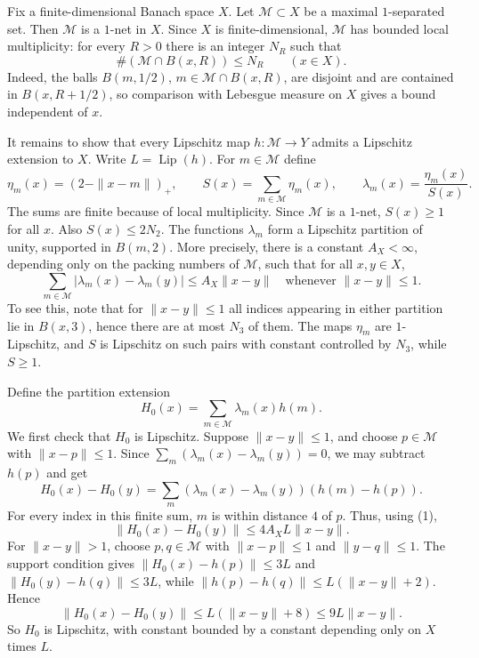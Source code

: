 \documentclass[11pt]{article}
\newcommand{\M}{\mathcal{M}}
\newcommand{\Lip}{\operatorname{Lip}}
\begin{document}
Fix a finite-dimensional Banach space \(X\).  Let \(\M\subset X\) be a
maximal \(1\)-separated set.  Then \(\M\) is a \(1\)-net in \(X\).  Since
\(X\) is finite-dimensional, \(\M\) has bounded local multiplicity: for every
\(R>0\) there is an integer \(N_R\) such that
\[
  \#(\M\cap B(x,R))\le N_R \qquad (x\in X).
\]
Indeed, the balls \(B(m,1/2)\), \(m\in \M\cap B(x,R)\), are disjoint and are
contained in \(B(x,R+1/2)\), so comparison with Lebesgue measure on \(X\)
gives a bound independent of \(x\).

It remains to show that every Lipschitz map \(h:\M\to Y\) admits a
Lipschitz extension to \(X\).  Write \(L=\Lip(h)\).  For \(m\in \M\) define
\[
  \eta_m(x)=(2-\|x-m\|)_+,\qquad
  S(x)=\sum_{m\in \M}\eta_m(x),\qquad
  \lambda_m(x)=\frac{\eta_m(x)}{S(x)}.
\]
The sums are finite because of local multiplicity.  Since \(\M\) is a
\(1\)-net, \(S(x)\ge 1\) for all \(x\).  Also \(S(x)\le 2N_2\).  The functions
\(\lambda_m\) form a Lipschitz partition of unity, supported in \(B(m,2)\).
More precisely, there is a constant \(A_X<\infty\), depending only on the
packing numbers of \(\M\), such that for all \(x,y\in X\),
\[
  \sum_{m\in \M} |\lambda_m(x)-\lambda_m(y)|
  \le A_X\|x-y\| \quad\text{whenever } \|x-y\|\le 1.      \tag{1}
\]
To see this, note that for \(\|x-y\|\le 1\) all indices appearing in either
partition lie in \(B(x,3)\), hence there are at most \(N_3\) of them.  The
maps \(\eta_m\) are \(1\)-Lipschitz, and \(S\) is Lipschitz on such pairs
with constant controlled by \(N_3\), while \(S\ge 1\).

Define the partition extension
\[
  H_0(x)=\sum_{m\in \M}\lambda_m(x)h(m).
\]
We first check that \(H_0\) is Lipschitz.  Suppose \(\|x-y\|\le 1\), and
choose \(p\in \M\) with \(\|x-p\|\le 1\).  Since
\(\sum_m(\lambda_m(x)-\lambda_m(y))=0\), we may subtract \(h(p)\) and get
\[
  H_0(x)-H_0(y)
  = \sum_m(\lambda_m(x)-\lambda_m(y))(h(m)-h(p)).
\]
For every index in this finite sum, \(m\) is within distance \(4\) of \(p\).
Thus, using (1),
\[
  \|H_0(x)-H_0(y)\| \le 4A_XL\|x-y\|.
\]
For \(\|x-y\|>1\), choose \(p,q\in \M\) with \(\|x-p\|\le 1\) and
\(\|y-q\|\le 1\).  The support condition gives
\(\|H_0(x)-h(p)\|\le 3L\) and \(\|H_0(y)-h(q)\|\le 3L\), while
\(\|h(p)-h(q)\|\le L(\|x-y\|+2)\).  Hence
\[
  \|H_0(x)-H_0(y)\|\le L(\|x-y\|+8)\le 9L\|x-y\|.
\]
So \(H_0\) is Lipschitz, with constant bounded by a constant depending only
on \(X\) times \(L\).
\end{document}
